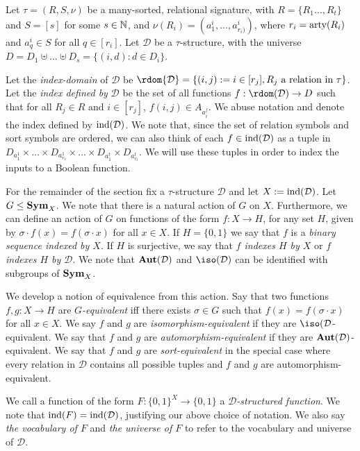 \documentclass[../paper.tex]{subfiles}
\begin{document}
Let $\tau = (R, S, \nu)$ be a many-sorted, relational signature, with $R = \{R_1
\ldots, R_t\}$ and $S = [s]$ for some $s \in \mathbb{N}$, and $\nu(R_i) = (a^i_1,
\ldots , a^i_{r_i)})$, where $r_i = \mathrm{arty}(R_i)$ and $a^i_q \in S$ for all $q \in
[r_i]$. Let $\mathcal{D}$ be a $\tau$-structure, with the universe $D = D_1
\uplus \ldots \uplus D_s = \{(i,d) : d \in D_i\}$.

Let the \emph{index-domain} of $\mathcal{D}$ be $\rdom {\mathcal{D}} = \{(i, j)
:= i \in [r_j], R_j \text{ a relation in $\tau$} \}$. Let the \emph{index
  defined by} $\mathcal{D}$ be the set of all functions $f: \rdom(\mathcal{D})
\rightarrow D$ such that for all $R_j \in R$ and $i \in [r_j]$, $f(i, j) \in
A_{a^{j}_i}$. We abuse notation and denote the index defined by
$\text{\upshape ind}(\mathcal{D})$. We note that, since the set of relation symbols and sort
symbols are ordered, we can also think of each $f \in \text{\upshape ind}(\mathcal{D})$ as a
tuple in $D_{a^1_1} \times \ldots \times D_{a^1_{r_1}} \times \ldots \times
D_{a^t_1} \times D_{a^t_{r_t}}$. We will use these tuples in order to index the
inputs to a Boolean function.

For the remainder of the section fix a $\tau$-structure $\mathcal{D}$ and let $X
:= \text{\upshape ind} (\mathcal{D})$. Let $G \leq \text{\textbf{Sym}}_{X}$. We note that there is a natural
action of $G$ on $X$. Furthermore, we can define an action of $G$ on functions
of the form $f: X \rightarrow H$, for any set $H$, given by $\sigma \cdot f(x) =
f(\sigma \cdot x)$ for all $x \in X$. If $H = \{0,1\}$ we say that $f$ is a
\emph{binary sequence indexed by $X$}. If $H$ is surjective, we say that
\emph{$f$ indexes $H$ by $X$} or \emph{$f$ indexes $H$ by $\mathcal{D}$}. We
note that $\text{\textbf{Aut}}(\mathcal{D})$ and $\iso(\mathcal{D})$ can be identified with
subgroups of $\text{\textbf{Sym}}_X$.

We develop a notion of equivalence from this action. Say that two functions $f,
g : X \rightarrow H$ are \emph{$G$-equivalent} iff there exists $\sigma \in G$
such that $f(x) = f(\sigma \cdot x)$ for all $x \in X$. We say $f$ and $g$ are
\emph{isomorphism-equivalent} if they are $\iso(\mathcal{D}$-equivalent. We say
that $f$ and $g$ are \emph{automorphism-equivalent} if they are $
\text{\textbf{Aut}}(\mathcal{D})$-equivalent. We say that $f$ and $g$ are
\emph{sort-equivalent} in the special case where every relation in $\mathcal{D}$
contains all possible tuples and $f$ and $g$ are automorphism-equivalent.

We call a function of the form $F:\{0,1\}^{X} \rightarrow \{0,1\}$ a
\emph{$\mathcal{D}$-structured function}. We note that $\text{\upshape ind}(F) =
\text{\upshape ind}(\mathcal{D})$, justifying our above choice of notation. We also say
\emph{the vocabulary of $F$} and \emph{the universe of $F$} to refer to the
vocabulary and universe of $\mathcal{D}$.
\end{document}
